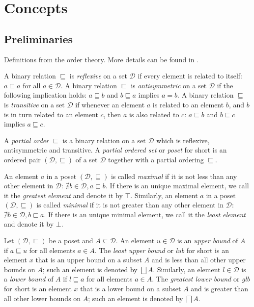 \documentclass[a4paper]{book}
\begin{document}
\part{Concepts}

\chapter{Preliminaries}

Definitions from the order theory.  More details can be found in
\cite{DP02}.

A binary relation $\sqsubseteq$ is \emph{reflexive} on a set
$\mathcal{D}$ if every element is related to itself: $a \sqsubseteq a$
for all $a \in \mathcal{D}$.  A binary relation $\sqsubseteq$ is
\emph{antisymmetric} on a set $\mathcal{D}$ if the following
implication holds: $a \sqsubseteq b$ and $b \sqsubseteq a$ implies $a
= b$.  A binary relation $\sqsubseteq$ is \emph{transitive} on a set
$\mathcal{D}$ if whenever an element $a$ is related to an element $b$,
and $b$ is in turn related to an element $c$, then $a$ is also related
to $c$: $a \sqsubseteq b$ and $b \sqsubseteq c$ implies $a \sqsubseteq
c$.

A \emph{partial order} $\sqsubseteq$ is a binary relation on a set
$\mathcal{D}$ which is reflexive, antisymmetric and transitive.  A
\emph{partial ordered set} or \emph{poset} for short is an ordered
pair $(\mathcal{D}, \sqsubseteq)$ of a set $\mathcal{D}$ together with
a partial ordering $\sqsubseteq$.

An element $a$ in a poset $(\mathcal{D}, \sqsubseteq)$ is called
\emph{maximal} if it is not less than any other element in
$\mathcal{D}$: $\nexists b \in \mathcal{D}, a \sqsubset b$.  If there
is an unique maximal element, we call it the \emph{greatest element}
and denote it by $\top$.  Similarly, an element $a$ in a poset
$(\mathcal{D}, \sqsubseteq)$ is called \emph{minimal} if it is not
greater than any other element in $\mathcal{D}$: $\nexists b \in
\mathcal{D}, b \sqsubset a$.  If there is an unique minimal element,
we call it the \emph{least element} and denote it by $\bot$.

Let $(\mathcal{D}, \sqsubseteq)$ be a poset and $A \subseteq
\mathcal{D}$.  An element $u \in \mathcal{D}$ is an \emph{upper bound}
of $A$ if $a \sqsubseteq u$ for all elements $a \in A$. The
\emph{least upper bound} or \emph{lub} for short is an element $x$
that is an upper bound on a subset $A$ and is less than all other
upper bounds on $A$; such an element is denoted by $\bigsqcup A$.
Similarly, an element $l \in \mathcal{D}$ is a \emph{lower bound} of
$A$ if $l \sqsubseteq a$ for all elements $a \in A$. The
\emph{greatest lower bound} or \emph{glb} for short is an element $x$
that is a lower bound on a subset $A$ and is greater than all other
lower bounds on $A$; such an element is denoted by $\bigsqcap A$.
\end{document}
